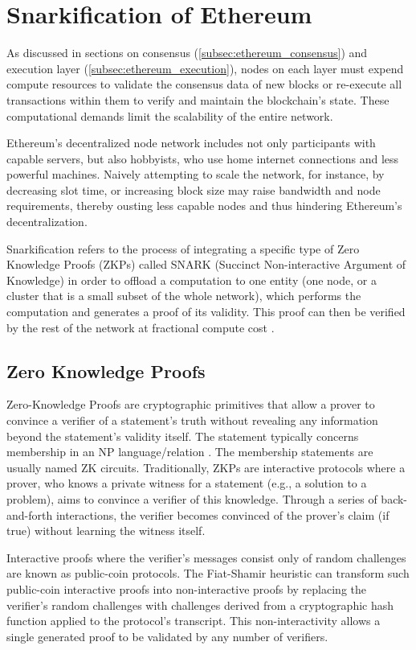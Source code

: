 \section{Snarkification of Ethereum}\label{sec:snarkification}

As discussed in sections on consensus (\ref{subsec:ethereum_consensus}) and
execution layer (\ref{subsec:ethereum_execution}), nodes on each layer must expend
compute resources to validate the consensus data of new blocks or re-execute all
transactions within them to verify and maintain the blockchain's state.
These computational demands limit the scalability of the entire network.

Ethereum's decentralized node network includes not only participants with
capable servers, but also hobbyists, who use home internet connections and
less powerful machines. Naively attempting to scale the network, for instance,
by decreasing slot time, or increasing block size may raise bandwidth and node
requirements, thereby ousting less capable nodes and thus hindering Ethereum's
decentralization.

Snarkification refers to the process of integrating a specific type of Zero
Knowledge Proofs (ZKPs) called SNARK (Succinct Non-interactive Argument of
Knowledge) in order to offload a computation to one entity (one node, or a
cluster that is a small subset of the whole network), which performs the
computation and generates a proof of its validity. This proof can then be
verified by the rest of the network at fractional compute cost \cite{NativeRollups}.

\subsection{Zero Knowledge Proofs}

Zero-Knowledge Proofs are cryptographic primitives that allow a prover
to convince a verifier of a statement's truth without revealing any
information beyond the statement's validity itself. The statement typically
concerns membership in an NP language/relation \cite{GoldreichNPProofs}.
The membership statements are usually named ZK circuits.
Traditionally, ZKPs are interactive protocols where a prover, who knows a
private witness for a statement (e.g., a solution to a problem), aims to
convince a verifier of this knowledge. Through a series of back-and-forth
interactions, the verifier becomes convinced of the prover's claim (if true)
without learning the witness itself.

Interactive proofs where the verifier's messages consist only of random
challenges are known as public-coin protocols. The Fiat-Shamir heuristic \cite{FiatShamir}
can transform such public-coin interactive proofs into non-interactive
proofs by replacing the verifier's random challenges with challenges derived
from a cryptographic hash function applied to the protocol's transcript. This
non-interactivity allows a single generated proof to be validated by any
number of verifiers.

